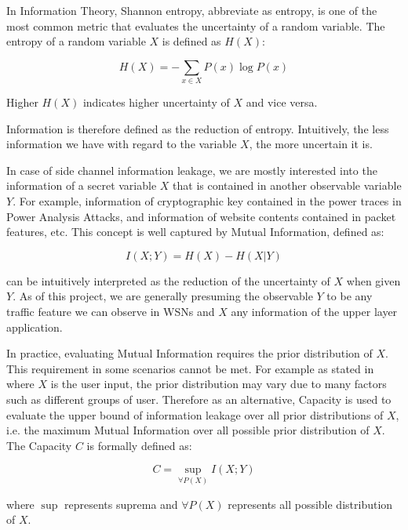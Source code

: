 In Information Theory, Shannon entropy, abbreviate as entropy, is one of the most common metric that evaluates the uncertainty of a random variable. The entropy of a random variable $X$ is defined as $H(X)$:

\begin{equation} \label{Eq: Entropy}
	H(X) = - \sum_{x \in X}{P(x) \log{P(x)}}
\end{equation}

Higher $H(X)$ indicates higher uncertainty of $X$ and vice versa.

Information is therefore defined as the reduction of entropy. Intuitively, the less information we have with regard to the variable $X$, the more uncertain it is.

In case of side channel information leakage, we are mostly interested into the information of a secret variable $X$ that is contained in another observable variable $Y$. For example, information of cryptographic key contained in the power traces in Power Analysis Attacks\cite{DPA}, and information of website contents contained in packet features, etc. This concept is well captured by Mutual Information, defined as:

\begin{equation} \label{Eq: MI}
	I(X;Y) = H(X) - H(X | Y)
\end{equation}

 can be intuitively interpreted as the reduction of the uncertainty of $X$ when given $Y$. As of this project, we are generally presuming the observable $Y$ to be any traffic feature we can observe in WSNs and $X$ any information of the upper layer application.

In practice, evaluating Mutual Information requires the prior distribution of $X$. This requirement in some scenarios cannot be met. For example as stated in \cite{PinpointWeb} where $X$ is the user input, the prior distribution may vary due to many factors such as different groups of user. Therefore as an alternative,  Capacity is used to evaluate the upper bound of information leakage over all prior distributions of $X$, i.e. the maximum Mutual Information over all possible prior distribution of $X$. The Capacity $C$ is formally defined as:

\begin{equation} \label{Eq: Capacity}
	C = \sup_{\forall P(X)}{I(X;Y)}
\end{equation}

where $\sup$ represents suprema and $\forall P(X)$ represents all possible distribution of $X$.

